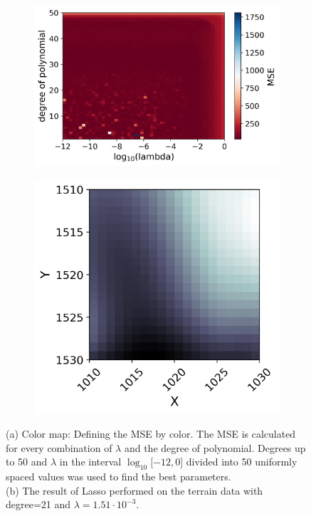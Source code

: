\documentclass[../main.tex]{subfiles}
\begin{document}
\begin{figure}[H] 
   \centering
   \begin{subfigure}[b]{0.56\textwidth}
    \centering
    \includegraphics[width=\textwidth]{../assets/terrain-lasso-degree-lambda-colormap.png} 
    \caption{}
    \label{fig:lasso_regularization}
   \end{subfigure}
   \quad
   \begin{subfigure}[b]{0.4\textwidth}
    \centering
    \includegraphics[width=\textwidth]{../assets/Terrain_lasso_bestdegree.png} 
    \caption{}
    \label{fig:lasso-estimate}
   \end{subfigure}
   \caption{(a) Color map: Defining the MSE by color. The MSE is calculated for every combination of $\lambda$ and the degree of polynomial. Degrees up to 50 and $\lambda$ in the interval $\log_{10}[ -12,0 $] divided into 50 uniformly spaced values was used to find the best parameters. \\ (b) The result of Lasso performed on the terrain data with degree=21 and $\lambda=1.51 \cdot 10^{-3}$.}
   \label{fig:terrain-lasso}
\end{figure} 
\end{document}
